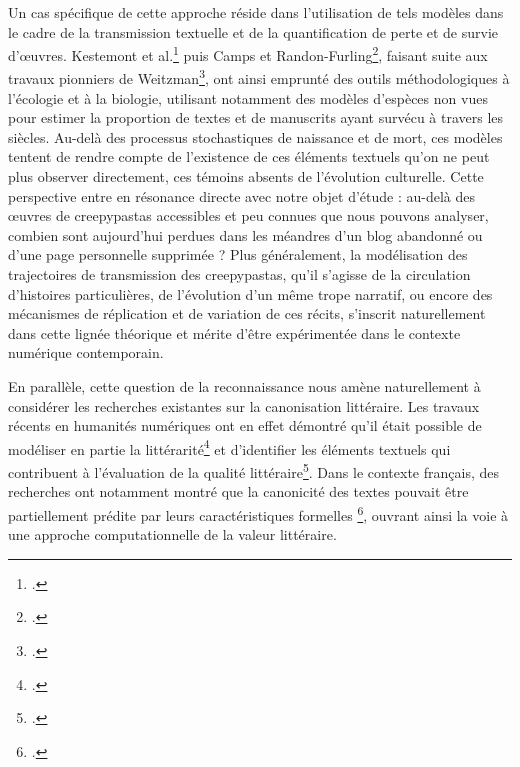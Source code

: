 \documentclass[12pt,a4paper,oneside,titlepage]{book} %
\begin{document}
Un cas spécifique de cette approche réside dans l'utilisation de tels modèles dans le cadre de la transmission textuelle et de la quantification de perte et de survie d'œuvres. Kestemont et al.\footcite{kestemont2022forgotten} puis Camps et Randon-Furling\footcite{camps2022lostmanuscriptsextincttexts}, faisant suite aux travaux pionniers de Weitzman\footcite{Weitzman1987}, ont ainsi emprunté des outils méthodologiques à l'écologie et à la biologie, utilisant notamment des modèles d'espèces non vues pour estimer la proportion de textes et de manuscrits ayant survécu à travers les siècles. Au-delà des processus stochastiques de naissance et de mort, ces modèles tentent de rendre compte de l'existence de ces éléments textuels qu'on ne peut plus observer directement, ces témoins absents de l'évolution culturelle.
Cette perspective entre en résonance directe avec notre objet d'étude : au-delà des œuvres de creepypastas accessibles et peu connues que nous pouvons analyser, combien sont aujourd'hui perdues dans les méandres d'un blog abandonné ou d'une page personnelle supprimée ? Plus généralement, la modélisation des trajectoires de transmission des creepypastas, qu'il s'agisse de la circulation d'histoires particulières, de l'évolution d'un même trope narratif, ou encore des mécanismes de réplication et de variation de ces récits, s'inscrit naturellement dans cette lignée théorique et mérite d'être expérimentée dans le contexte numérique contemporain.

En parallèle, cette question de la reconnaissance nous amène naturellement à considérer les recherches existantes sur la canonisation littéraire. Les travaux récents en humanités numériques ont en effet démontré qu'il était possible de modéliser en partie la littérarité\footcite{koolen_literary_2020} et d'identifier les éléments textuels qui contribuent à l'évaluation de la qualité littéraire\footcite{van_cranenburgh_identifying_2015}. Dans le contexte français, des recherches ont notamment montré que la canonicité des textes pouvait être partiellement prédite par leurs caractéristiques formelles \footcite{barre_operationalizing_2023}, ouvrant ainsi la voie à une approche computationnelle de la valeur littéraire.

\end{document}
